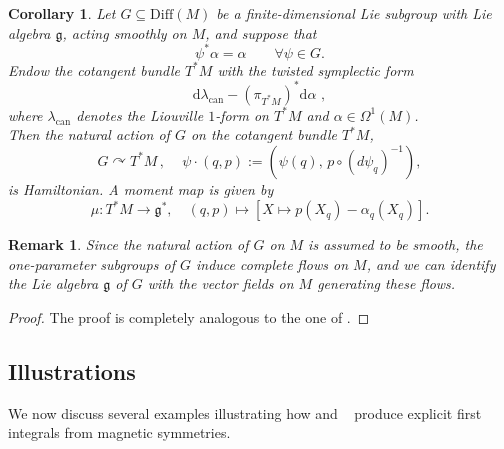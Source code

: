 \documentclass[11pt,reqno]{amsart}
\theoremstyle{plain}
\newtheorem{cor}[thm]{Corollary}
\newtheorem{rem}[thm]{Remark}
\theoremstyle{definition}
\numberwithin{equation}{section}
\def\d{\delta}
\def\d{\delta}
\def\d{{\mathrm{d}}}
\newcommand{\comma}[0]{\, , \,}
\begin{document}
\begin{cor}
    \label{thm: Hamiltonian action cotangent bundle}
Let $G\subseteq \mathrm{Diff}(M)$ be a finite-dimensional Lie subgroup with Lie algebra $\mathfrak{g}$, acting smoothly on $M$, and suppose that
\[
\psi^*\alpha = \alpha \qquad \forall \psi\in G.
\]
Endow the cotangent bundle $T^*M$ with the twisted symplectic form
\[
\d \lambda_{\mathrm{can}} - (\pi_{T^*M})^* \d \alpha \,\, ,
\]
where $\lambda_{\mathrm{can}}$ denotes the Liouville $1$-form on $T^*M$ and $\alpha\in \Omega^1(M)$.\\
\noindent Then the natural action of $G$ on the cotangent bundle $T^*M$,
\[
G \curvearrowright T^*M \comma \quad \psi \cdot (q,p) := (\psi(q), \, p \circ (d\psi_q)^{-1}),
\]
is Hamiltonian. A moment map is given by
\[
\mu: T^*M\longrightarrow \mathfrak{g}^*,\quad(q,p)\mapsto \left[X\mapsto p(X_q) - \alpha_q (X_q)\right].
\]
\end{cor}

\begin{rem}
  Since the natural action of $G$ on $M$ is assumed to be smooth, the one-parameter subgroups of $G$ induce complete flows on $M$, and we can identify the Lie algebra $\mathfrak{g}$ of $G$ with the vector fields on $M$ generating these flows.   
\end{rem}

\begin{proof}
The proof is completely analogous to the one of .
\end{proof}


\subsection{Illustrations}\label{subsection:illustrations_intregrals_of_motion}
We now discuss several examples illustrating how  and ~ produce explicit first integrals from magnetic symmetries.
\end{document}

